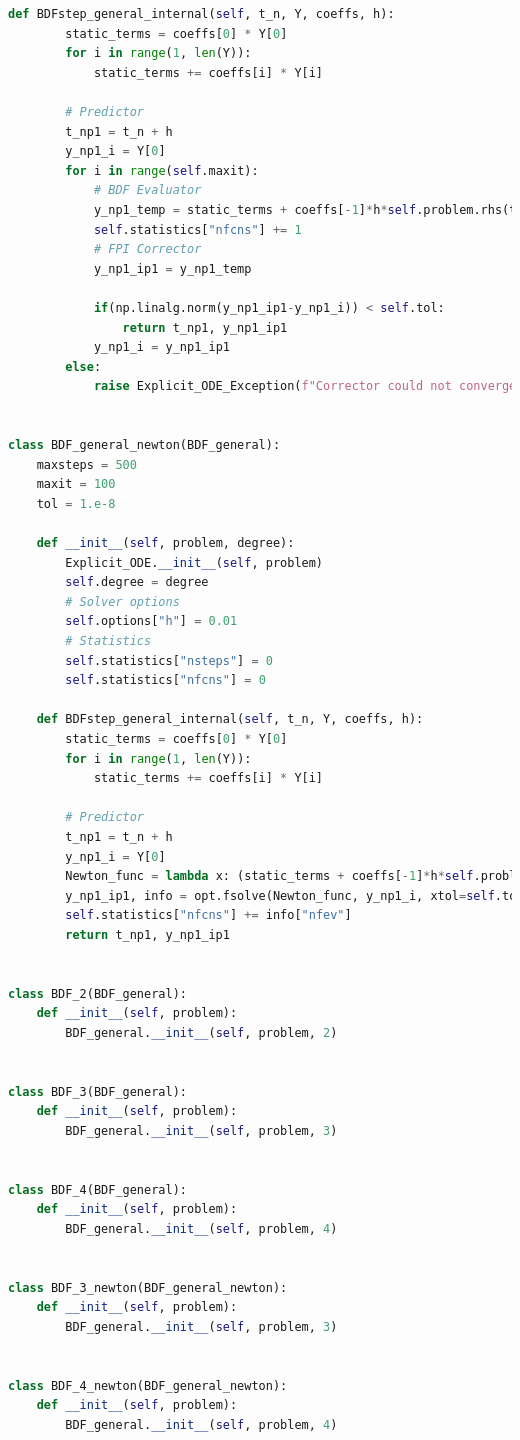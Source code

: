 \documentclass{article}
\begin{document}
\begin{lstlisting}[language=python]
    def BDFstep_general_internal(self, t_n, Y, coeffs, h):
        static_terms = coeffs[0] * Y[0]
        for i in range(1, len(Y)):
            static_terms += coeffs[i] * Y[i]

        # Predictor
        t_np1 = t_n + h
        y_np1_i = Y[0]
        for i in range(self.maxit):
            # BDF Evaluator
            y_np1_temp = static_terms + coeffs[-1]*h*self.problem.rhs(t_np1, y_np1_i)
            self.statistics["nfcns"] += 1
            # FPI Corrector
            y_np1_ip1 = y_np1_temp

            if(np.linalg.norm(y_np1_ip1-y_np1_i)) < self.tol:
                return t_np1, y_np1_ip1
            y_np1_i = y_np1_ip1
        else:
            raise Explicit_ODE_Exception(f"Corrector could not converge within {i} iterations")


class BDF_general_newton(BDF_general):
    maxsteps = 500
    maxit = 100
    tol = 1.e-8

    def __init__(self, problem, degree):
        Explicit_ODE.__init__(self, problem)
        self.degree = degree
        # Solver options
        self.options["h"] = 0.01
        # Statistics
        self.statistics["nsteps"] = 0
        self.statistics["nfcns"] = 0

    def BDFstep_general_internal(self, t_n, Y, coeffs, h):
        static_terms = coeffs[0] * Y[0]
        for i in range(1, len(Y)):
            static_terms += coeffs[i] * Y[i]

        # Predictor
        t_np1 = t_n + h
        y_np1_i = Y[0]
        Newton_func = lambda x: (static_terms + coeffs[-1]*h*self.problem.rhs(t_np1, x)) - x
        y_np1_ip1, info = opt.fsolve(Newton_func, y_np1_i, xtol=self.tol, full_output=True)[:2]
        self.statistics["nfcns"] += info["nfev"]
        return t_np1, y_np1_ip1


class BDF_2(BDF_general):
    def __init__(self, problem):
        BDF_general.__init__(self, problem, 2)


class BDF_3(BDF_general):
    def __init__(self, problem):
        BDF_general.__init__(self, problem, 3)


class BDF_4(BDF_general):
    def __init__(self, problem):
        BDF_general.__init__(self, problem, 4)


class BDF_3_newton(BDF_general_newton):
    def __init__(self, problem):
        BDF_general.__init__(self, problem, 3)


class BDF_4_newton(BDF_general_newton):
    def __init__(self, problem):
        BDF_general.__init__(self, problem, 4)
\end{lstlisting}
\end{document}
